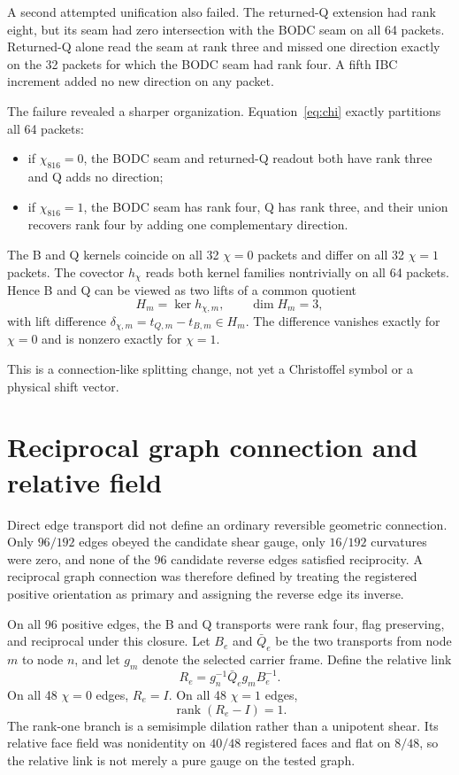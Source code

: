 \documentclass[12pt,a4paper,twoside]{article}
\newcommand{\rank}{\operatorname{rank}}
\begin{document}
A second attempted unification also failed. The returned-Q extension had rank eight, but its seam had zero intersection with the BODC seam on all 64 packets. Returned-Q alone read the seam at rank three and missed one direction exactly on the 32 packets for which the BODC seam had rank four. A fifth IBC increment added no new direction on any packet.

The failure revealed a sharper organization. Equation~\eqref{eq:chi} exactly partitions all 64 packets:
\begin{itemize}
  \item if $\chi_{816}=0$, the BODC seam and returned-Q readout both have rank three and Q adds no direction;
  \item if $\chi_{816}=1$, the BODC seam has rank four, Q has rank three, and their union recovers rank four by adding one complementary direction.
\end{itemize}

The B and Q kernels coincide on all 32 $\chi=0$ packets and differ on all 32 $\chi=1$ packets. The covector $h_\chi$ reads both kernel families nontrivially on all 64 packets. Hence B and Q can be viewed as two lifts of a common quotient
\[
H_m=\ker h_{\chi,m},\qquad \dim H_m=3,
\]
with lift difference $\delta_{\chi,m}=t_{Q,m}-t_{B,m}\in H_m$. The difference vanishes exactly for $\chi=0$ and is nonzero exactly for $\chi=1$.

This is a connection-like splitting change, not yet a Christoffel symbol or a physical shift vector.

\section{Reciprocal graph connection and relative field}

Direct edge transport did not define an ordinary reversible geometric connection. Only $96/192$ edges obeyed the candidate shear gauge, only $16/192$ curvatures were zero, and none of the 96 candidate reverse edges satisfied reciprocity. A reciprocal graph connection was therefore defined by treating the registered positive orientation as primary and assigning the reverse edge its inverse.

On all 96 positive edges, the B and Q transports were rank four, flag preserving, and reciprocal under this closure. Let $B_e$ and $\bar Q_e$ be the two transports from node $m$ to node $n$, and let $g_m$ denote the selected carrier frame. Define the relative link
\begin{equation}
R_e=g_n^{-1}\bar Q_e g_m B_e^{-1}.
\label{eq:relative}
\end{equation}
On all 48 $\chi=0$ edges, $R_e=I$. On all 48 $\chi=1$ edges,
\begin{equation}
\rank(R_e-I)=1.
\end{equation}
The rank-one branch is a semisimple dilation rather than a unipotent shear. Its relative face field was nonidentity on $40/48$ registered faces and flat on $8/48$, so the relative link is not merely a pure gauge on the tested graph.
\end{document}
